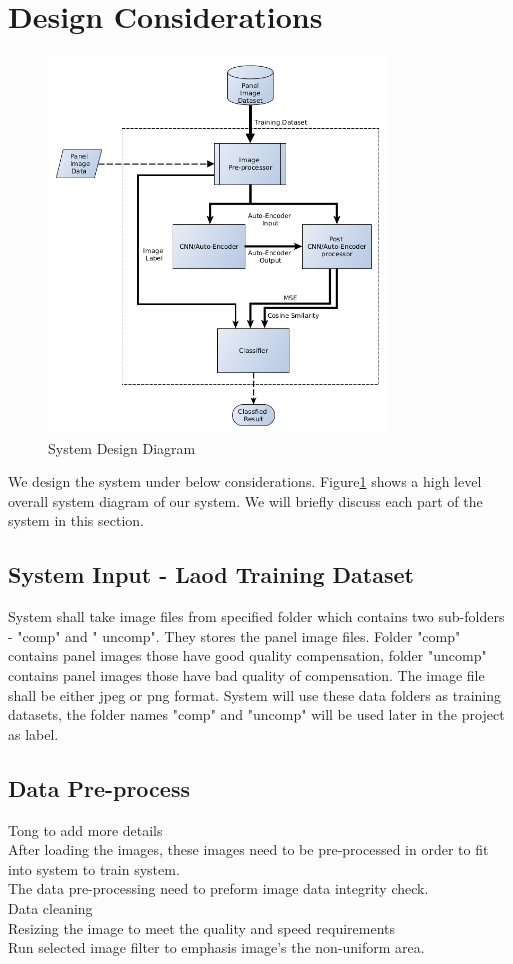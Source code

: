 \documentclass[runningheads]{llncs}
\begin{document}
\section{Design Considerations}
\begin{figure}
    \centering
    \includegraphics[width=0.8\textwidth]{system_diagram.png}
    \caption{System Design Diagram}
    \label{fig:3}
\end{figure}
We design the system under below considerations. Figure\ref{fig:3} shows a high level overall system diagram of our system. We will briefly discuss each part of the system in this section.

\subsection{System Input - Laod Training Dataset}
System shall take image files from specified folder which contains two sub-folders - "comp" and " uncomp". They stores the panel image files. Folder "comp" contains panel images those have good quality compensation, folder "uncomp" contains panel images those have bad quality of compensation. The image file shall be either jpeg or png format. System will use these data folders as training datasets, the folder names "comp" and "uncomp" will be used later in the project as label.
\subsection{Data Pre-process}
Tong to add more details\\
After loading the images, these images need to be pre-processed in order to fit into system to train system. \\
The data pre-processing need to preform image data integrity check.\\
Data cleaning\\
Resizing the image to meet the quality and speed requirements\\
Run selected image filter to emphasis image's the non-uniform area.
\end{document}
